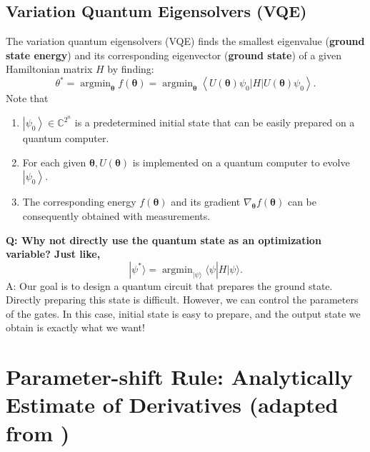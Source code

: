 \documentclass[
        11pt, %
	a4paper, %
]{LegrandOrangeBook}
\begin{document}
\subsection{Variation Quantum Eigensolvers (VQE) \cite{ding2023random}}

The variation quantum eigensolvers (VQE) finds the smallest eigenvalue (\textbf{ground state energy}) and its corresponding eigenvector (\textbf{ground state}) of a given Hamiltonian matrix $H$ by finding:
\begin{equation}
    \theta^*=\operatorname{argmin}_{\boldsymbol{\theta}} f(\boldsymbol{\theta})=\operatorname{argmin}_{\boldsymbol{\theta}}\left\langle U(\boldsymbol{\theta}) \psi_0|H| U(\boldsymbol{\theta}) \psi_0\right\rangle .
\end{equation}
Note that
\begin{enumerate}
    \item $\left|\psi_0\right\rangle \in \mathbb{C}^{2^n}$ is a predetermined initial state that can be easily prepared on a quantum computer.
    \item For each given $\boldsymbol{\theta}, U(\boldsymbol{\theta})$ is implemented on a quantum computer to evolve $\left|\psi_0\right\rangle$.
    \item The corresponding energy $f(\boldsymbol{\theta})$ and its gradient $\nabla_{\boldsymbol{\theta}} f(\boldsymbol{\theta})$ can be consequently obtained with measurements. 
\end{enumerate}

\textbf{Q: Why not directly use the quantum state as an optimization variable? Just like,}
\begin{equation}
    | \psi^*\rangle
=\operatorname{argmin}_{|\psi\rangle} \langle \psi| H | \psi\rangle.
\end{equation}
A: Our goal is to design a quantum circuit that prepares the ground state. Directly preparing this state is difficult. However, we can control the parameters of the gates. In this case, initial state is easy to prepare, and the output state we obtain is exactly what we want!

\section{Parameter-shift Rule: Analytically Estimate of Derivatives (adapted from \cite{crooks2019gradients})}

\end{document}

